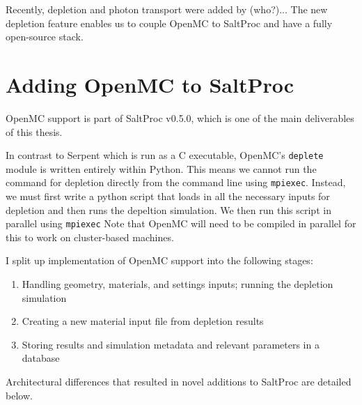Recently, depletion and photon transport were added by (who?)... The new depletion feature enables us to couple OpenMC to SaltProc and have a fully open-source stack. 

\section{Adding OpenMC to SaltProc}%
\label{sec:adding_openmc_to_saltproc}

OpenMC support is part of SaltProc v0.5.0, which is one of the main deliverables of this thesis.

In contrast to Serpent which is run as a C executable, OpenMC's \verb.deplete. module is written entirely within Python. This means we cannot run the command for depletion directly from the command line using \verb.mpiexec.. Instead, we must first write a python script that loads in all the necessary inputs for depletion and then runs the depeltion simulation. We then run this script in parallel using \verb.mpiexec. Note that OpenMC will need to be compiled in parallel for this to work on
cluster-based machines.

I split up implementation of OpenMC support into the following stages:
\begin{enumerate}
    \item Handling geometry, materials, and settings inputs; running the depletion simulation
    \item Creating a new material input file from depletion results
    \item Storing results and simulation metadata and relevant parameters in a database
\end{enumerate}

Architectural differences that resulted in novel additions to SaltProc are detailed below.


